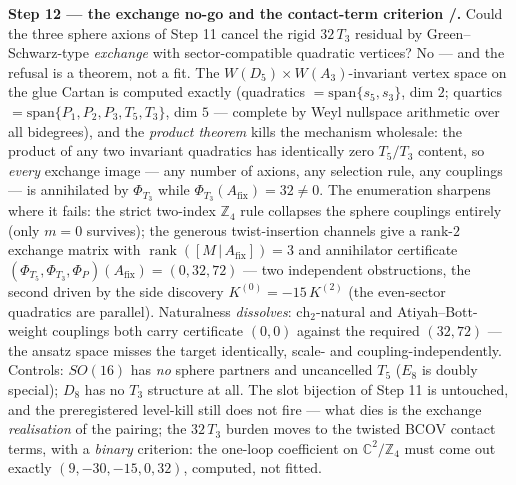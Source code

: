 \documentclass[11pt,a4paper]{article}
\newcommand{\Z}{\mathbb{Z}}
\theoremstyle{definition}
\begin{document}
\par\smallskip\noindent\textbf{Step 12 --- the exchange no-go and the contact-term criterion
\mE/\mC.} Could the three sphere axions of Step 11 cancel the rigid $32\,T_3$ residual by
Green--Schwarz-type \emph{exchange} with sector-compatible quadratic vertices? No --- and the
refusal is a theorem, not a fit. The $W(D_5){\times}W(A_3)$-invariant vertex space on the glue
Cartan is computed exactly (quadratics $=\mathrm{span}\{s_5,s_3\}$, dim $2$; quartics
$=\mathrm{span}\{P_1,P_2,P_3,T_5,T_3\}$, dim $5$ --- complete by Weyl nullspace arithmetic over
all bidegrees), and the \emph{product theorem} kills the mechanism wholesale: the product of any
two invariant quadratics has identically zero $T_5/T_3$ content, so \emph{every} exchange image
--- any number of axions, any selection rule, any couplings --- is annihilated by $\Phi_{T_3}$
while $\Phi_{T_3}(A_{\mathrm{fix}})=32\neq0$. The enumeration sharpens where it fails: the strict
two-index $\Z_4$ rule collapses the sphere couplings entirely (only $m=0$ survives); the generous
twist-insertion channels give a rank-$2$ exchange matrix with
$\operatorname{rank}([M\,|\,A_{\mathrm{fix}}])=3$ and annihilator certificate
$(\Phi_{T_5},\Phi_{T_3},\Phi_P)(A_{\mathrm{fix}})=(0,32,72)$ --- two independent obstructions,
the second driven by the side discovery $K^{(0)}=-15\,K^{(2)}$ (the even-sector quadratics are
parallel). Naturalness \emph{dissolves}: $\mathrm{ch}_2$-natural and Atiyah--Bott-weight couplings
both carry certificate $(0,0)$ against the required $(32,72)$ --- the ansatz space misses the
target identically, scale- and coupling-independently. Controls: $SO(16)$ has \emph{no} sphere
partners and uncancelled $T_5$ ($E_8$ is doubly special); $D_8$ has no $T_3$ structure at all.
The slot bijection of Step 11 is untouched, and the preregistered level-kill still does not fire
--- what dies is the exchange \emph{realisation} of the pairing; the $32\,T_3$ burden moves to
the twisted BCOV contact terms, with a \emph{binary} criterion: the one-loop coefficient on
$\mathbb C^2/\Z_4$ must come out exactly $(9,-30,-15,0,32)$, computed, not fitted.
\end{document}
